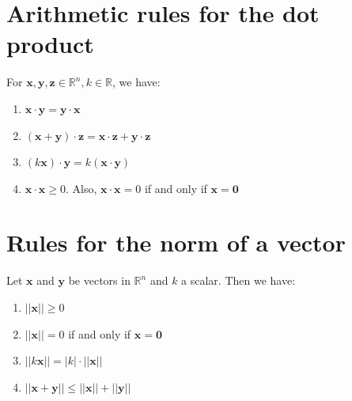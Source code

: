 \documentclass[11pt]{article}
\begin{document}
\section{Arithmetic rules for the dot product}
\label{sec:org9f1ed55}
For \(\boldsymbol{x}, \boldsymbol{y}, \boldsymbol{z} \in \mathbb{R}^n, k \in \mathbb{R}\), we have:
\begin{enumerate}
\item \(\boldsymbol{x} \cdot \boldsymbol{y} = \boldsymbol{y} \cdot \boldsymbol{x}\)
\item \((\boldsymbol{x} + \boldsymbol{y}) \cdot \boldsymbol{z} = \boldsymbol{x} \cdot \boldsymbol{z} + \boldsymbol{y} \cdot \boldsymbol{z}\)
\item \((k\boldsymbol{x}) \cdot \boldsymbol{y} = k(\boldsymbol{x} \cdot \boldsymbol{y})\)
\item \(\boldsymbol{x} \cdot \boldsymbol{x} \ge 0\). Also, \(\boldsymbol{x} \cdot \boldsymbol{x} = 0\) if and only if \(\boldsymbol{x} = \boldsymbol{0}\)
\end{enumerate}
\section{Rules for the norm of a vector}
\label{sec:orgdc84039}
Let \(\boldsymbol{x}\) and \(\boldsymbol{y}\) be vectors in \(\mathbb{R}^n\) and \(k\) a scalar. Then we have:
\begin{enumerate}
\item \(|| \boldsymbol{x} || \ge 0\)
\item \(|| \boldsymbol{x} || = 0\) if and only if \(\boldsymbol{x} = \boldsymbol{0}\)
\item \(|| k \boldsymbol{x} || = |k| \cdot || \boldsymbol{x} ||\)
\item \(|| \boldsymbol{x} + \boldsymbol{y} || \le || \boldsymbol{x} || + || \boldsymbol{y} ||\)
\end{enumerate}
\end{document}
